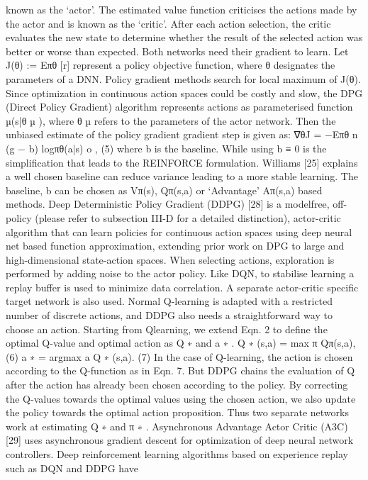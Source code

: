 known as the ‘actor’. The estimated value function criticises
the actions made by the actor and is known as the ‘critic’.
After each action selection, the critic evaluates the new state to
determine whether the result of the selected action was better
or worse than expected. Both networks need their gradient to
learn. Let J(θ) := Eπθ
[r] represent a policy objective function,
where θ designates the parameters of a DNN. Policy gradient
methods search for local maximum of J(θ). Since optimization
in continuous action spaces could be costly and slow, the
DPG (Direct Policy Gradient) algorithm represents actions
as parameterised function µ(s|θ
µ
), where θ
µ
refers to the
parameters of the actor network. Then the unbiased estimate
of the policy gradient gradient step is given as:
∇θJ = −Eπθ
n
(g − b) logπθ(a|s)
o
, (5)
where b is the baseline. While using b ≡ 0 is the simplification
that leads to the REINFORCE formulation. Williams [25]
explains a well chosen baseline can reduce variance leading
to a more stable learning. The baseline, b can be chosen
as Vπ(s), Qπ(s,a) or ‘Advantage’ Aπ(s,a) based methods.
Deep Deterministic Policy Gradient (DDPG) [28] is a modelfree, off-policy (please refer to subsection III-D for a detailed
distinction), actor-critic algorithm that can learn policies for
continuous action spaces using deep neural net based function
approximation, extending prior work on DPG to large and
high-dimensional state-action spaces. When selecting actions,
exploration is performed by adding noise to the actor policy.
Like DQN, to stabilise learning a replay buffer is used to
minimize data correlation. A separate actor-critic specific
target network is also used. Normal Q-learning is adapted with
a restricted number of discrete actions, and DDPG also needs
a straightforward way to choose an action. Starting from Qlearning, we extend Eqn. 2 to define the optimal Q-value and
optimal action as Q
∗
and a
∗
.
Q
∗
(s,a) = max
π
Qπ(s,a), (6)
a
∗ = argmax
a
Q
∗
(s,a). (7)
In the case of Q-learning, the action is chosen according to
the Q-function as in Eqn. 7. But DDPG chains the evaluation
of Q after the action has already been chosen according to the
policy. By correcting the Q-values towards the optimal values
using the chosen action, we also update the policy towards the
optimal action proposition. Thus two separate networks work
at estimating Q
∗
and π
∗
.
Asynchronous Advantage Actor Critic (A3C) [29] uses
asynchronous gradient descent for optimization of deep neural
network controllers. Deep reinforcement learning algorithms
based on experience replay such as DQN and DDPG have
